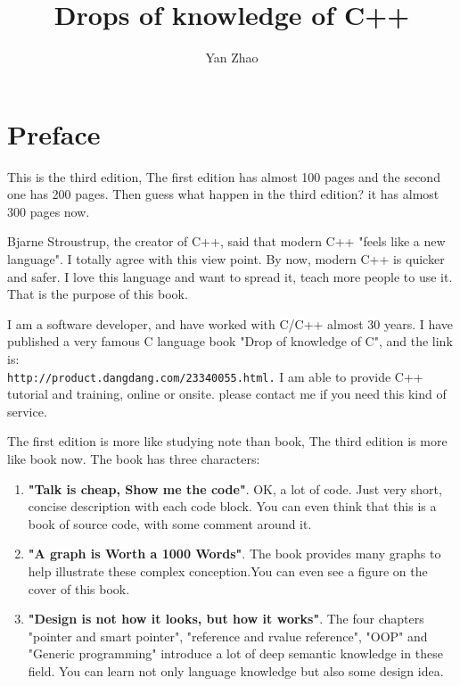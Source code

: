 \documentclass[a4paper,11pt,twoside]{book}
\begin{document}
\title{Drops of knowledge of C++}
\author{Yan Zhao}
\date{}\maketitle

\setcounter{secnumdepth}{4}
\setcounter{tocdepth}{4}
\tableofcontents

\chapter*{Preface}
This is the third edition, The first edition has almost 100 pages and the second one has 200 pages. Then guess what happen in the third edition? it has almost 300 pages now. \par \medskip

Bjarne Stroustrup, the creator of C++, said that modern C++  "feels like a new language". I totally agree with this view point. By now, modern C++ is quicker and safer. I love this language and want to spread it, teach more people to use it. That is the purpose of this book.  \par \medskip

I am a software developer, and have worked with C/C++ almost 30 years. I have published a very famous C language book "Drop of knowledge of C", and the link is:\\ \verb|http://product.dangdang.com/23340055.html.| I am able to provide C++ tutorial and training, online or onsite. please contact me if you need this kind of service.\par \par \medskip


The first edition is more like studying note than book, The third edition is more like book now. The book has three characters:
\begin{enumerate}
	\item \textbf{"Talk is cheap, Show me the code"}. OK, a lot of code. Just very short, concise description with each code block. You can even think that this is a book of source code, with some comment around it.
	
	\item \textbf{"A graph is Worth a 1000 Words"}. The book provides many graphs to help illustrate these complex conception.You can even see a figure on the cover of this book.
	
	\item \textbf{"Design is not how it looks, but how it works"}. The four chapters "pointer and smart pointer", "reference and rvalue reference", "OOP" and "Generic programming" introduce a lot of deep semantic knowledge in these field. You can learn not only language knowledge but also some design idea.
\end{enumerate}
\end{document}
